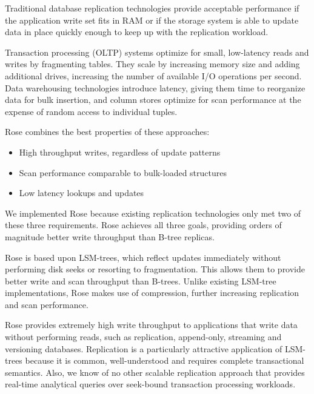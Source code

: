 \documentclass{vldb}
\newcommand{\rows}{Rose\xspace}
\newcommand{\rowss}{Rose's\xspace}
\begin{document}
Traditional database replication technologies provide acceptable
performance if the application write set fits in RAM or if the
storage system is able to update data in place quickly enough to keep
up with the replication workload.

Transaction processing (OLTP)
systems optimize for small, low-latency reads and writes by fragmenting tables.
They scale by increasing memory
size and adding additional drives, increasing the number of available
I/O operations per second.  Data warehousing technologies introduce
latency, giving them time to reorganize data for bulk insertion, and 
column stores optimize for scan performance at the expense of random
access to individual tuples.

\rows combines the best properties of these approaches:

\begin{itemize}
\item High throughput writes, regardless of update patterns
\item Scan performance comparable to bulk-loaded structures
\item Low latency lookups and updates
\end{itemize}
We implemented \rows because existing replication technologies
only met two of these three requirements.  \rows achieves all three
goals, providing orders of magnitude better write throughput than
B-tree replicas.

\rows is based upon LSM-trees, which reflect updates immediately
without performing disk seeks or resorting to fragmentation.  This
allows them to provide better write and scan throughput than B-trees.
Unlike existing LSM-tree implementations, \rows makes use of
compression, further increasing replication and scan performance.

\rows provides extremely high write throughput to applications that
write data without performing reads, such as replication, append-only, streaming
and versioning databases.
Replication is a particularly attractive application of LSM-trees because
it is common, well-understood and requires complete transactional
semantics.  Also, we know of no other scalable replication approach
that provides real-time analytical queries over seek-bound transaction
processing workloads.
\end{document}
